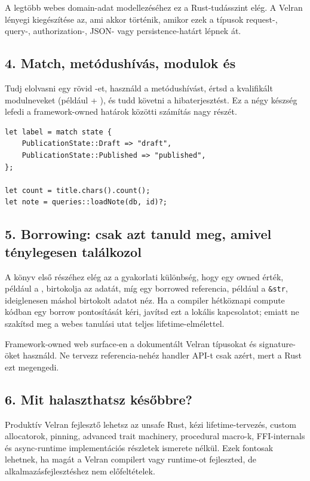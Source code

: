 A legtöbb webes domain-adat modellezéséhez ez a Rust-tudásszint elég. A Velran lényegi kiegészítése az, ami akkor történik, amikor ezek a típusok request-, query-, authorization-, JSON- vagy persistence-határt lépnek át.

\subsection*{4. Match, metódushívás, modulok és }

Tudj elolvasni egy rövid -et, használd a  metódushívást, értsd a kvalifikált modulneveket (például  + ), és tudd követni a  hibaterjesztést. Ez a négy készség lefedi a framework-owned határok közötti számítás nagy részét.

\begin{lstlisting}[language=Velran]
let label = match state {
    PublicationState::Draft => "draft",
    PublicationState::Published => "published",
};

let count = title.chars().count();
let note = queries::loadNote(db, id)?;
\end{lstlisting}

\subsection*{5. Borrowing: csak azt tanuld meg, amivel ténylegesen találkozol}

A könyv első részéhez elég az a gyakorlati különbség, hogy egy owned érték, például a , birtokolja az adatát, míg egy borrowed referencia, például a \texttt{\&str}, ideiglenesen máshol birtokolt adatot néz. Ha a compiler hétköznapi compute kódban egy borrow pontosítását kéri, javítsd ezt a lokális kapcsolatot; emiatt ne szakítsd meg a webes tanulási utat teljes lifetime-elmélettel.

Framework-owned web surface-en a dokumentált Velran típusokat és signature-öket használd. Ne tervezz referencia-nehéz handler API-t csak azért, mert a Rust ezt megengedi.

\subsection*{6. Mit halaszthatsz későbbre?}

Produktív Velran fejlesztő lehetsz az unsafe Rust, kézi lifetime-tervezés, custom allocatorok, pinning, advanced trait machinery, procedural macro-k, FFI-internals és async-runtime implementációs részletek ismerete nélkül. Ezek fontosak lehetnek, ha magát a Velran compilert vagy runtime-ot fejleszted, de alkalmazásfejlesztéshez nem előfeltételek.

